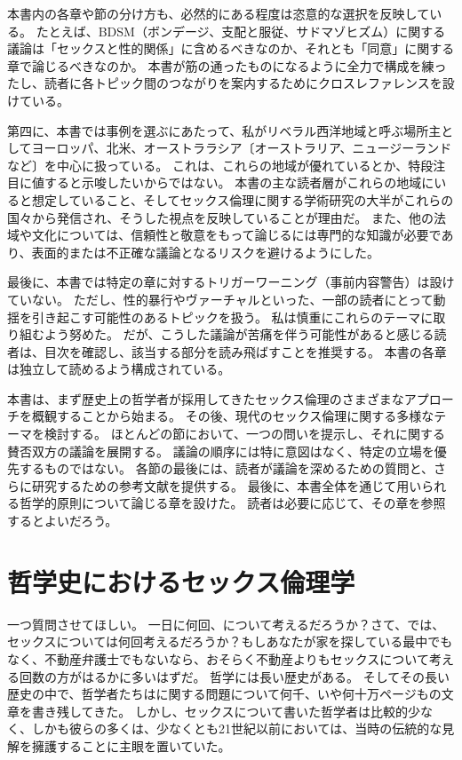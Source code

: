 \documentclass[paper=a4,book,openany]{jlreq} \usepackage{mystyle}
\begin{document}
本書内の各章や節の分け方も、必然的にある程度は恣意的な選択を反映している。
たとえば、BDSM（ボンデージ、支配と服従、サドマゾヒズム）に関する議論は「セックスと性的関係」に含めるべきなのか、それとも「同意」に関する章で論じるべきなのか。
本書が筋の通ったものになるように全力で構成を練ったし、読者に各トピック間のつながりを案内するためにクロスレファレンスを設けている。

第四に、本書では事例を選ぶにあたって、私がリベラル西洋地域と呼ぶ場所{\DDASH}主としてヨーロッパ、北米、オーストララシア〔オーストラリア、ニュージーランドなど〕{\DDASH}を中心に扱っている。
これは、これらの地域が優れているとか、特段注目に値すると示唆したいからではない。
本書の主な読者層がこれらの地域にいると想定していること、そしてセックス倫理に関する学術研究の大半がこれらの国々から発信され、そうした視点を反映していることが理由だ。
また、他の法域や文化については、信頼性と敬意をもって論じるには専門的な知識が必要であり、表面的または不正確な議論となるリスクを避けるようにした。

最後に、本書では特定の章に対するトリガーワーニング（事前内容警告）は設けていない。
ただし、性的暴行やヴァーチャルといった、一部の読者にとって動揺を引き起こす可能性のあるトピックを扱う。
私は慎重にこれらのテーマに取り組むよう努めた。
だが、こうした議論が苦痛を伴う可能性があると感じる読者は、目次を確認し、該当する部分を読み飛ばすことを推奨する。
本書の各章は独立して読めるよう構成されている。

本書は、まず歴史上の哲学者が採用してきたセックス倫理のさまざまなアプローチを概観することから始まる。
その後、現代のセックス倫理に関する多様なテーマを検討する。
ほとんどの節において、一つの問いを提示し、それに関する賛否双方の議論を展開する。
議論の順序には特に意図はなく、特定の立場を優先するものではない。
各節の最後には、読者が議論を深めるための質問と、さらに研究するための参考文献を提供する。
最後に、本書全体を通じて用いられる哲学的原則について論じる章を設けた。
読者は必要に応じて、その章を参照するとよいだろう。

\chapter{哲学史におけるセックス倫理学}

一つ質問させてほしい。
一日に何回、について考えるだろうか？さて、では、セックスについては何回考えるだろうか？もしあなたが家を探している最中でもなく、不動産弁護士でもないなら、おそらく不動産よりもセックスについて考える回数の方がはるかに多いはずだ。
哲学には長い歴史がある。
そしてその長い歴史の中で、哲学者たちはに関する問題について何千、いや何十万ページもの文章を書き残してきた。
しかし、セックスについて書いた哲学者は比較的少なく、しかも彼らの多くは、少なくとも21世紀以前においては、当時の伝統的な見解を擁護することに主眼を置いていた。
\end{document}
